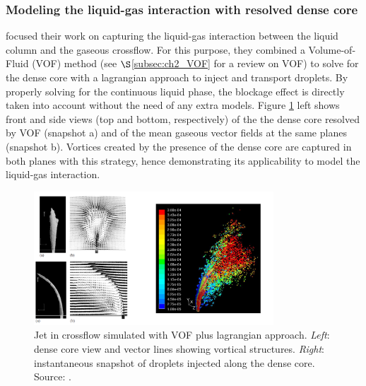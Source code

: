 \subsubsection*{Modeling the liquid-gas interaction with resolved dense core }

 focused their work on capturing the liquid-gas interaction between the liquid column and the gaseous crossflow. For this purpose, they combined a Volume-of-Fluid (VOF) method (see $\S$\ref{subsec:ch2_VOF} for a review on VOF) to solve for the dense core with a lagrangian approach to inject and transport droplets. By properly solving for the continuous liquid phase, the blockage effect is directly taken into account without the need of any extra models. Figure \ref{fig:arienti_2006_jicf} left shows front and side views (top and bottom, respectively) of the the dense core resolved by VOF (snapshot a) and of the mean gaseous vector fields at the same planes (snapshot b). Vortices created by the presence of the dense core are captured in both planes with this strategy, hence demonstrating its applicability to model the liquid-gas interaction.


\begin{figure}[ht]
    \centering
    \includegraphics[width=0.8\textwidth]{./part1_numerical_approaches/figures_ch3/arienti_2006_jicf_ORIGINAL}
       \centering
    \caption[Jet in crossflow simulated with VOF plus lagrangian approach.]{Jet in crossflow simulated with VOF plus lagrangian approach. \textsl{Left}: dense core view and vector lines showing vortical structures. \textsl{Right}: instantaneous snapshot of droplets injected along the dense core. Source: .}
    \label{fig:arienti_2006_jicf}
\end{figure}

